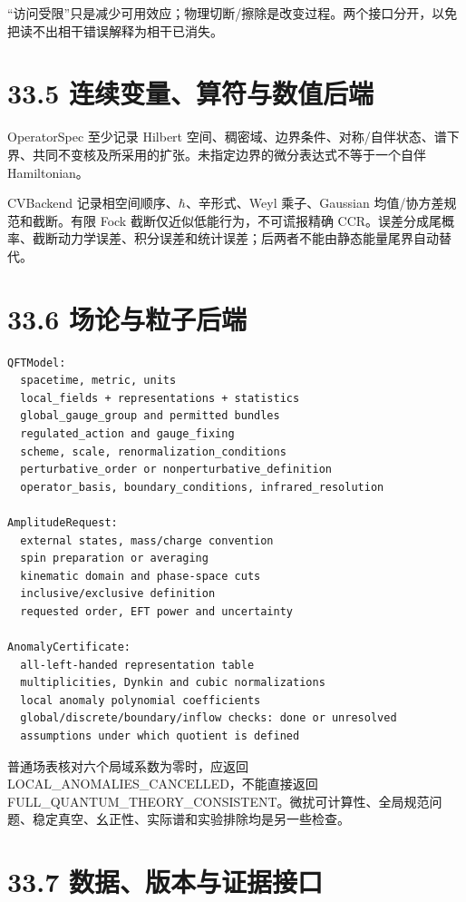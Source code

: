 \documentclass[
  11pt,
  oneside]{book}
\begin{document}
``访问受限''只是减少可用效应；物理切断/擦除是改变过程。两个接口分开，以免把读不出相干错误解释为相干已消失。

\section{33.5 连续变量、算符与数值后端}

OperatorSpec 至少记录 Hilbert
空间、稠密域、边界条件、对称/自伴状态、谱下界、共同不变核及所采用的扩张。未指定边界的微分表达式不等于一个自伴
Hamiltonian。

CVBackend 记录相空间顺序、\(\hbar\)、辛形式、Weyl 乘子、Gaussian
均值/协方差规范和截断。有限 Fock 截断仅近似低能行为，不可谎报精确
CCR。误差分成尾概率、截断动力学误差、积分误差和统计误差；后两者不能由静态能量尾界自动替代。

\section{33.6 场论与粒子后端}

\begin{Verbatim}[breaklines,breakanywhere,fontsize=\scriptsize]
QFTModel:
  spacetime, metric, units
  local_fields + representations + statistics
  global_gauge_group and permitted bundles
  regulated_action and gauge_fixing
  scheme, scale, renormalization_conditions
  perturbative_order or nonperturbative_definition
  operator_basis, boundary_conditions, infrared_resolution

AmplitudeRequest:
  external states, mass/charge convention
  spin preparation or averaging
  kinematic domain and phase-space cuts
  inclusive/exclusive definition
  requested order, EFT power and uncertainty

AnomalyCertificate:
  all-left-handed representation table
  multiplicities, Dynkin and cubic normalizations
  local anomaly polynomial coefficients
  global/discrete/boundary/inflow checks: done or unresolved
  assumptions under which quotient is defined
\end{Verbatim}

普通场表核对六个局域系数为零时，应返回
LOCAL\_\allowbreak ANOMALIES\_\allowbreak CANCELLED，不能直接返回
FULL\_\allowbreak QUANTUM\_\allowbreak THEORY\_\allowbreak CONSISTENT。微扰可计算性、全局规范问题、稳定真空、幺正性、实际谱和实验排除均是另一些检查。

\section{33.7 数据、版本与证据接口}
\end{document}
